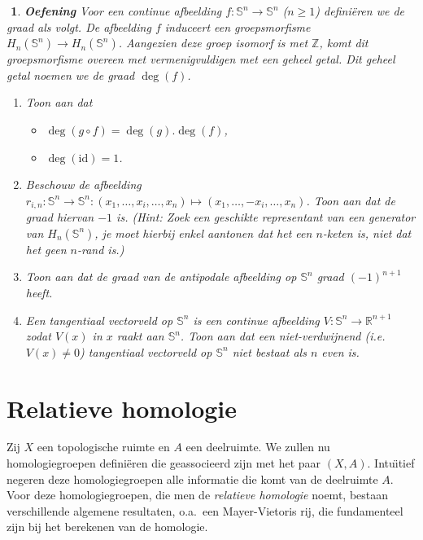 \documentclass[12pt]{book}
\newtheorem{eoef}{$\!\!$}[chapter]
\newenvironment{oef}{\begin{eoef} {\bf Oefening}}{\end{eoef}}
\begin{document}
\begin{oef}
Voor een continue afbeelding $f: \mathbb{S}^n \to \mathbb{S}^n$ ($n \geq 1$) defini\"eren we de graad als volgt. De afbeelding $f$ induceert een groepsmorfisme $H_n(\mathbb{S}^n ) \to H_n(\mathbb{S}^n )$. Aangezien deze groep isomorf is met $\mathbb{Z}$, komt dit groepsmorfisme overeen met vermenigvuldigen met een geheel getal. Dit geheel getal noemen we de graad $\deg(f)$.
\begin{enumerate}
\item Toon aan dat 
\begin{itemize}
\item
$\deg(g \circ f) = \deg(g). \deg(f) $,
\item $\deg(\mathrm{id}) = 1 $.
\end{itemize}

\item
Beschouw de afbeelding $r_{i,n} : \mathbb{S}^n \to \mathbb{S}^n: (x_1, \dots, x_i, \dots, x_n) \mapsto (x_1, \dots, - x_i, \dots, x_n)$. Toon aan dat de graad hiervan $-1$ is. (Hint: Zoek een geschikte representant van een generator van $H_n(\mathbb{S}^n )$, je moet hierbij enkel aantonen dat het een $n$-keten is, niet dat het geen $n$-rand is.)

\item
Toon aan dat de graad van de antipodale afbeelding op $\mathbb{S}^n$ graad $(-1)^{n+1}$ heeft. 

\item
Een tangentiaal vectorveld op $\mathbb{S}^n$ is een continue afbeelding $V: \mathbb{S}^n \rightarrow \mathbb{R}^{n+1}$ zodat $V(x)$ in $x$ raakt aan $\mathbb{S}^n$. Toon aan dat een niet-verdwijnend (i.e. $V(x) \neq 0$) tangentiaal vectorveld op $\mathbb{S}^n$ niet  bestaat als $n$ even is.

\end{enumerate}
\end{oef}
\section{Relatieve homologie}

Zij $X$ een topologische ruimte en $A$ een deelruimte. We zullen nu homologiegroepen defini\"eren die geassocieerd zijn met het paar $(X,A)$.  Intu\"{\i}tief negeren deze homologiegroepen alle informatie die komt van de deelruimte $A$. Voor deze homologiegroepen, die men de {\em relatieve homologie} noemt, bestaan verschillende algemene resultaten, o.a.\ een Mayer-Vietoris rij, die fundamenteel zijn bij het berekenen van de homologie.
\end{document}
